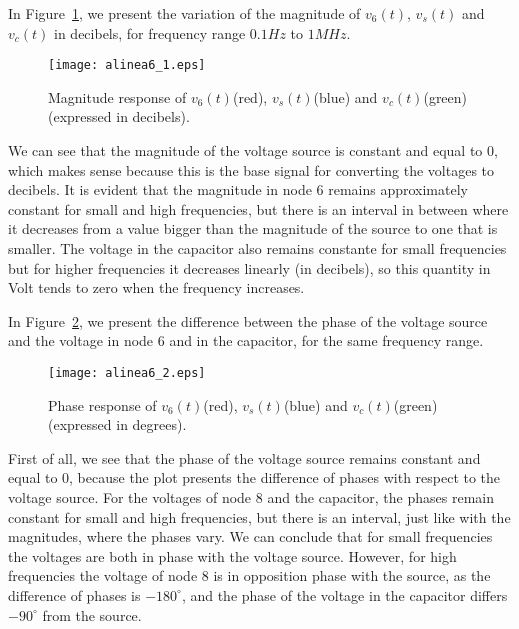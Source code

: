 In Figure~\ref{fig:magnitude}, we present the variation of the magnitude of $v_6(t)$, $v_s(t)$ and $v_c(t)$ in decibels, for frequency range $0.1Hz$ to $1MHz$.

\begin{figure}[H] \centering
\texttt{[image: alinea6\_1.eps]}
\caption{Magnitude response of $v_6(t)$(red), $v_s(t)$(blue) and $v_c(t)$(green) (expressed in decibels).}
\label{fig:magnitude}
\end{figure}

We can see that the magnitude of the voltage source is constant and equal to 0, which makes sense because this is the base signal for converting the voltages to decibels. It is evident that the magnitude in node 6 remains approximately constant for small and high frequencies, but there is an interval in between where it decreases from a value bigger than the magnitude of the source to one that is smaller. The voltage in the capacitor also remains constante for small frequencies but for higher frequencies it decreases linearly (in decibels), so this quantity in Volt tends to zero when the frequency increases.

In Figure~\ref{fig:phase}, we present the difference between the phase of the voltage source and the voltage in node 6 and in the capacitor, for the same frequency range.

\begin{figure}[H] \centering
\texttt{[image: alinea6\_2.eps]}
\caption{Phase response of $v_6(t)$(red), $v_s(t)$(blue) and $v_c(t)$(green) (expressed in degrees).}
\label{fig:phase}
\end{figure}

First of all, we see that the phase of the voltage source remains constant and equal to 0, because the plot presents the difference of phases with respect to the voltage source. For the voltages of node 8 and the capacitor, the phases remain constant for small and high frequencies, but there is an interval, just like with the magnitudes, where the phases vary. We can conclude that for small frequencies the voltages are both in phase with the voltage source. However, for high frequencies the voltage of node 8 is in opposition phase with the source, as the difference of phases is $-180^{\circ}$, and the phase of the voltage in the capacitor differs $-90^{\circ}$ from the source.

